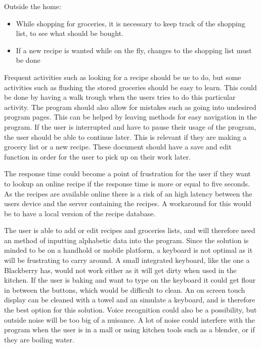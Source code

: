 Outside the home:
\begin{itemize}
\item While shopping for groceries, it is necessary to keep track of the shopping list, to see what should be bought.
\item If a new recipe is wanted while on the fly, changes to the shopping list must be done
\end{itemize}

Frequent activities such as looking for a recipe should be ue to do, but some activities such as flushing the stored groceries should be easy to learn. This could be done by having a walk trough when the users tries to do this particular activity. The program should also allow for mistakes such as going into undesired program pages. This can be helped by leaving methods for easy navigation in the program. If the user is interrupted and have to pause their usage of the program, the user should be able to continue later. This is relevant if they are making a grocery list or a new recipe. These document should have a save and edit function in order for the user to pick up on their work later.

The response time could become a point of frustration for the user if they want to lookup an online recipe if the response time is more or equal to five seconds. As the recipes are available online there is a risk of an high latency between the users device and the server containing the recipes. A workaround for this would be to have a local version of the recipe database. %

The user is able to add or edit recipes and groceries lists, and will therefore need an method of inputting alphabetic data into the program. Since the  solution is minded to be on a handhold or mobile platform, a keyboard is not optimal as it will be frustrating to carry around. A small integrated keyboard, like the one a Blackberry has\cite{blakBerry}, would not work either as it will get dirty when used in the kitchen. If the user is baking and want to type on the keyboard it could get flour in between the buttons, which would be difficult to clean. An on screen touch display can be cleaned with a towel and an simulate a keyboard, and is therefore the best option for this solution. Voice recognition could also be a possibility, but outside noise will be too big of a nuisance. A lot of noise could interfere with the program when the user is in a mall or using kitchen tools such as a blender, or if they are boiling water.
